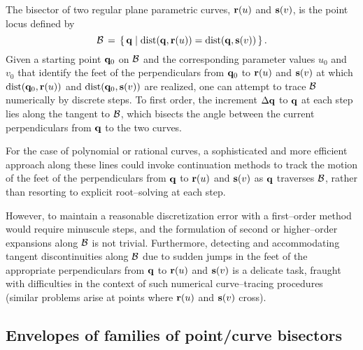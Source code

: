 The bisector of two regular plane parametric curves, ${\bf r}(u)$
and ${\bf s}(v)$, is the point locus defined by
\begin{equation}
{\cal B} \,=\, \{\, {\bf q} \;|\;
{\rm dist}({\bf q},{\bf r}(u))={\rm dist}({\bf q},{\bf s}(v)) \,\} \,.
\end{equation}
Given a starting point ${\bf q}_0$ on ${\cal B}$ and the
corresponding parameter values $u_0$ and $v_0$ that identify the
feet of the perpendiculars from ${\bf q}_0$ to ${\bf r}(u)$ and
${\bf s}(v)$ at which ${\rm dist}({\bf q}_0,{\bf r}(u))$ and
${\rm dist}({\bf q}_0,{\bf s}(v))$ are realized, one can attempt
to trace ${\cal B}$ numerically by discrete steps. To first order,
the increment $\Delta {\bf q}$ to ${\bf q}$ at each step lies
along the tangent to ${\cal B}$, which bisects the angle between
the current perpendiculars from ${\bf q}$ to the two curves.

For the case of polynomial or rational curves, a sophisticated and
more efficient approach along these lines could invoke continuation
methods \cite{morgan87} to track the motion of the feet of the
perpendiculars from ${\bf q}$ to ${\bf r}(u)$ and ${\bf s}(v)$ as
${\bf q}$ traverses ${\cal B}$, rather than resorting to explicit
root--solving at each step.

However, to maintain a reasonable discretization error with
a first--order method would require minuscule steps, and the
formulation of second or higher--order expansions along ${\cal B}$
is not trivial. Furthermore, detecting and accommodating tangent
discontinuities along ${\cal B}$ due to sudden jumps in the feet
of the appropriate perpendiculars from ${\bf q}$ to ${\bf r}(u)$
and ${\bf s}(v)$ is a delicate task, fraught with difficulties
in the context of such numerical curve--tracing procedures
(similar problems arise at points where ${\bf r}(u)$ and
${\bf s}(v)$ cross).

\subsection{Envelopes of families of point/curve bisectors}

